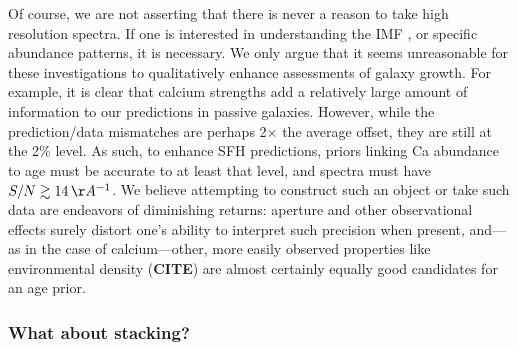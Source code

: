 \documentclass[a4paper,fleqn,usenatbib]{mnras}
\newcommand{\bfr}{\bf\color{red}}
\newcommand{\CITE}{{\bfr CITE}}
\begin{document}




Of course, we are not asserting that there is never a reason to take high resolution spectra. If 
one is interested in understanding the IMF \citep{Conroy12}, or specific abundance 
patterns, it is necessary. We only argue that it seems unreasonable for these investigations to
qualitatively enhance assessments of galaxy growth. For example, it is clear that calcium strengths
add a relatively large amount of information to our predictions in passive galaxies. However,
while the prediction/data mismatches are perhaps 2$\times$ the average offset, they are still 
at the 2\% level. As such, to enhance SFH predictions, priors linking Ca abundance to age must 
be accurate to at least that level, and spectra must have $S/N\gtrsim14\,\AA^{-1}$. We 
believe attempting to construct such an object or take such data are endeavors of diminishing 
returns: aperture and other observational effects surely distort one's ability to interpret such 
precision when present, and---as in the case of calcium---other, more easily observed 
properties like environmental density (\CITE) are almost certainly equally good candidates 
for an age prior.

\subsubsection{What about stacking?}
\label{sec:stacking}
\end{document}
